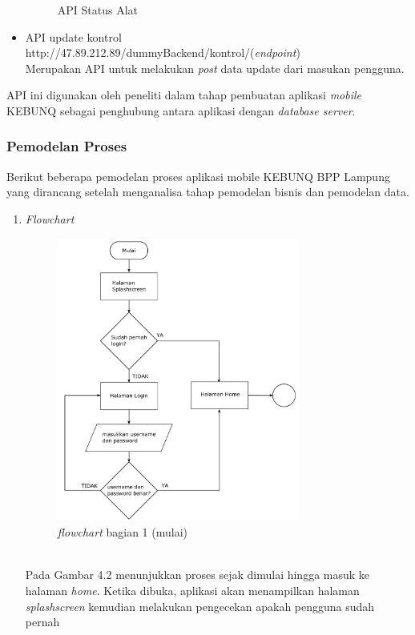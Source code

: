 \begin{flushleft}
\begin{justify}
\begin{itemize}
\begin{figure}[ht]
                    \caption{API Status Alat}
                \end{figure}
                \item API update kontrol\\
                http://47.89.212.89/dummyBackend/kontrol/(\emph{endpoint})\\
                Merupakan API untuk melakukan \emph{post} data update dari masukan pengguna.
            \end{itemize}
        API ini digunakan oleh peneliti dalam tahap pembuatan aplikasi \emph{mobile} KEBUNQ sebagai penghubung antara aplikasi dengan \emph{database server}.\\
        

        
        \subsubsection{Pemodelan Proses}
        Berikut beberapa pemodelan proses aplikasi mobile KEBUNQ BPP Lampung yang dirancang setelah menganalisa tahap pemodelan bisnis dan 
            pemodelan data.
        \begin{enumerate}[label=\alph*.]
            \item \emph{Flowchart}\\
            \begin{figure}[ht]
                \centering
                \includegraphics[width=8cm]{images/bab 4/fc 1.png}
                \caption{\textit{flowchart} bagian 1 (mulai)}
            \end{figure}
            \\Pada Gambar 4.2 menunjukkan proses  sejak dimulai hingga masuk ke halaman \emph{home}. Ketika dibuka, aplikasi akan menampilkan halaman \emph{splashscreen} kemudian melakukan pengecekan apakah pengguna sudah pernah

\end{enumerate}
\end{justify}
\end{flushleft}
